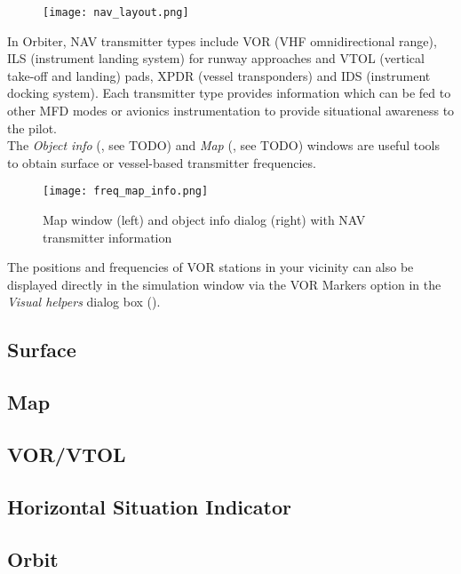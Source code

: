 \documentclass[Orbiter User Manual.tex]{subfiles}
\begin{document}
\begin{figure}[H]
  \centering
  \texttt{[image: nav\_layout.png]}
\end{figure}

\noindent
In Orbiter, NAV transmitter types include VOR (VHF omnidirectional range), ILS (instrument landing system) for runway approaches and VTOL (vertical take-off and landing) pads, XPDR (vessel transponders) and IDS (instrument docking system). Each transmitter type provides information which can be fed to other MFD modes or avionics instrumentation to provide situational awareness to the pilot.\\
The \textit{Object info} (\Ctrl{}, see TODO) and \textit{Map} (\Ctrl{}, see TODO) windows are useful tools to obtain surface or vessel-based transmitter frequencies.

\begin{figure}[H]
  \centering
  \texttt{[image: freq\_map\_info.png]}
  \caption{Map window (left) and object info dialog (right) with NAV transmitter information}
\end{figure}

\noindent
The positions and frequencies of VOR stations in your vicinity can also be displayed directly in the simulation window via the VOR Markers option in the \textit{Visual helpers} dialog box (\Ctrl{}).


\subsection{Surface}

\subsection{Map}

\subsection{VOR/VTOL}

\subsection{Horizontal Situation Indicator}

\subsection{Orbit}
\end{document}
